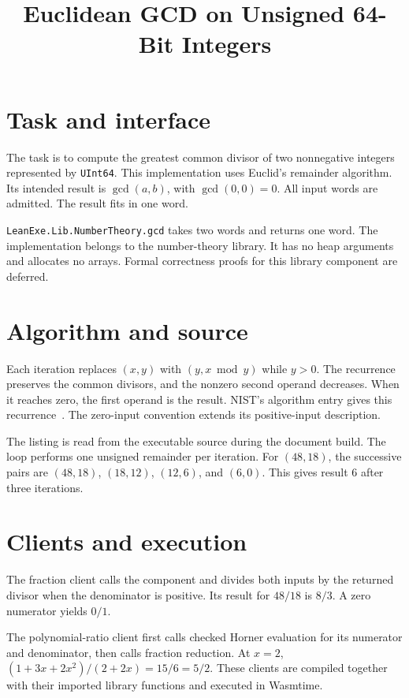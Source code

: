 
\title{Euclidean GCD on Unsigned 64-Bit Integers}

\maketitle

\section{Task and interface}
The task is to compute the greatest common divisor of two nonnegative integers
represented by \texttt{UInt64}.  This implementation uses Euclid's remainder
algorithm.  Its intended result is $\gcd(a,b)$, with $\gcd(0,0)=0$.
All input words are admitted.  The result fits in one word.

\texttt{LeanExe.Lib.NumberTheory.gcd} takes two words and returns one word.
The implementation belongs to the number-theory library.  It has no heap
arguments and allocates no arrays.  Formal correctness proofs for this
library component are deferred.

\section{Algorithm and source}
Each iteration replaces $(x,y)$ with $(y,x\bmod y)$ while $y>0$.
The recurrence preserves the common divisors, and the nonzero second operand
decreases.  When it reaches zero, the first operand is the result.  NIST's
algorithm entry gives this recurrence~\cite{euclid}.  The zero-input convention
extends its positive-input description.



The listing is read from the executable source during the document build.
The loop performs one unsigned remainder per iteration.  For $(48,18)$,
the successive pairs are $(48,18)$, $(18,12)$, $(12,6)$, and $(6,0)$.
This gives result $6$ after three iterations.

\section{Clients and execution}
The fraction client calls the component and divides both inputs by the returned
divisor when the denominator is positive.  Its result for $48/18$
is $8/3$.  A zero numerator yields $0/1$.

The polynomial-ratio client first calls checked Horner evaluation for its
numerator and denominator, then calls fraction reduction.  At $x=2$,
$(1+3x+2x^2)/(2+2x)=15/6=5/2$.  These clients are compiled together with
their imported library functions and executed in Wasmtime.

